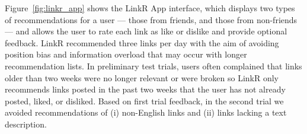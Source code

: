 Figure~\ref{fig:linkr_app} shows the LinkR App interface, which
displays two types of recommendations for a user --- those from
friends, and those from non-friends --- and allows the user to rate
each link as like or dislike and provide optional feedback.  
LinkR recommended three links per day with the aim of avoiding position
bias and information overload that may occur with longer
recommendation lists.  In preliminary test trials, users 
often complained that links older than two weeks were no longer relevant or
were broken so LinkR only recommends links posted in the past two
weeks that the user has not already posted, liked, or disliked.
Based on first trial feedback, in the second trial we avoided
recommendations of (i) non-English links and (ii) links lacking a text 
description.

 
